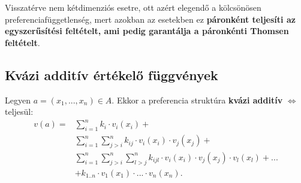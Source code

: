 \documentclass[a4paper,12pt]{article}
\begin{document}
Visszatérve nem kétdimenziós esetre, ott azért elegendő a kölcsönösen preferenciafüggetlenség, mert azokban az esetekben ez \textbf{páronként teljesíti az egyszerűsítési feltételt, ami pedig garantálja a páronkénti Thomsen feltételt}.

\subsection{Kvázi additív értékelő függvények}
Legyen $a=(x_1, ... , x_n) \in A$. Ekkor a preferencia struktúra \textbf{kvázi additív} $\Leftrightarrow$ teljesül: 
\begin{equation}
\begin{split}
v(a) = & \sum_{i=1}^n k_i \cdot v_i(x_i)+ \\
&\sum_{i=1}^n \sum_{j>i}^n k_{ij} \cdot v_i(x_i) \cdot v_j(x_j) + \\
&\sum_{i=1}^n \sum_{j>i}^n \sum_{l>j}^n k_{ijl} \cdot v_i(x_i)\cdot v_j(x_j)\cdot v_l(x_l) + ... \\ 
&+k_{1..n}\cdot v_1(x_1)\cdot  ... \cdot  v_n(x_n). \\
\end{split}
\end{equation} 
\end{document}
